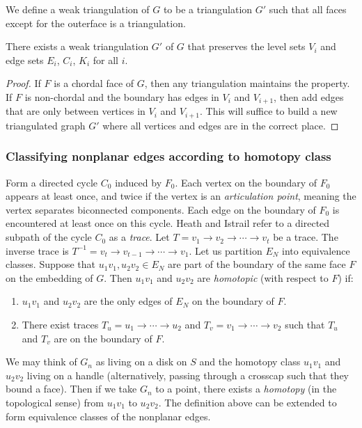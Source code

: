 We define a weak triangulation of \(G\) to be a triangulation \(G'\) such that all faces except for the outerface is a triangulation.
\begin{claim}
	There exists a weak triangulation $G'$ of \(G\) that preserves the level sets \(V_i\) and edge sets \(E_i\), \(C_i\), \(K_i\) for all \(i\).
\end{claim}

\begin{proof}
	If \(F\) is a chordal face of \(G\), then any triangulation maintains the property. If \(F\) is non-chordal and the boundary has edges in \(V_i\) and \(V_{i + 1}\), then add edges that are only between vertices in \(V_i\) and \(V_{i + 1}\). This will suffice to build a new triangulated graph \(G'\) where all vertices and edges are in the correct place.
\end{proof}

\subsubsection{Classifying nonplanar edges according to homotopy class}

Form a directed cycle \(C_0\) induced by \(F_0\). Each vertex on the boundary of \(F_0\) appears at least once, and twice if the vertex is an \textit{articulation point}, meaning the vertex separates biconnected components. Each edge on the boundary of \(F_0\) is encountered at least once on this cycle. Heath and Istrail refer to a directed subpath of the cycle \(C_0\) as a \textit{trace}. Let \(T = v_1 \rightarrow v_2 \rightarrow \cdots \rightarrow v_t\) be a trace. The inverse trace is \(T^{-1} = v_t \rightarrow v_{t-1} \rightarrow \cdots \rightarrow v_1\). Let us partition \(E_N\) into equivalence classes. Suppose that \(u_1v_1, u_2v_2 \in E_N\) are part of the boundary of the same face \(F\) on the embedding of \(G\). Then \(u_1v_1\) and \(u_2v_2\) are \textit{homotopic} (with respect to \(F\)) if:
\begin{enumerate}
	\item \(u_1v_1\) and \(u_2v_2\) are the only edges of \(E_N\) on the boundary of \(F\).
	\item There exist traces \(T_u = u_1 \rightarrow \cdots \rightarrow u_2\) and \(T_v = v_1 \rightarrow \cdots \rightarrow v_2\) such that \(T_u\) and \(T_v\) are on the boundary of \(F\).
\end{enumerate}
We may think of \(G_n\) as living on a disk on \(S\) and the homotopy class \(u_1v_1\) and \(u_2 v_2\) living on a handle (alternatively, passing through a crosscap such that they bound a face). Then if we take \(G_n\) to a point, there exists a \textit{homotopy} (in the topological sense) from \(u_1v_1\) to \(u_2v_2\). The definition above can be extended to form equivalence classes of the nonplanar edges.

